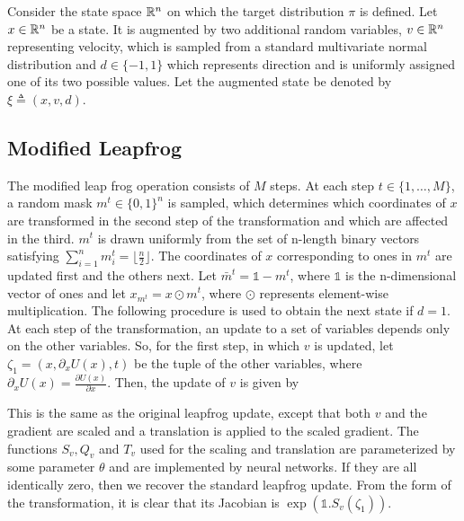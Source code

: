 \documentclass[letterpaper,english,10pt]{article}
\begin{document}
Consider the state space $\mathbb{R}^n$ on which the target distribution $\pi$ is defined. Let $x \in \mathbb{R}^n$ be a state. It is augmented by two additional random variables, $v \in \mathbb{R}^n$ representing velocity, which is sampled from a standard multivariate normal distribution and $d \in \{-1, 1\}$ which represents direction and is uniformly assigned one of its two possible values. Let the augmented state be denoted by $\xi \triangleq (x,v,d)$.

\subsection{Modified Leapfrog}
The modified leap frog operation consists of $M$ steps. At each step $t \in \{1, \dots, M \}$, a random mask $m^t \in \{ 0, 1 \}^n$ is sampled, which determines which coordinates of $x$ are transformed in the second step of the transformation and which are affected in the third. $m^t$ is drawn uniformly from the set of n-length binary vectors satisfying $ \sum_{i=1}^{n} m_i^t = \lfloor \frac{n}{2} \rfloor $. The coordinates of $x$ corresponding to ones in $m^t$ are updated first and the others next. Let $\bar{m}^t = \mathbb{1} - m^t$, where $\mathbb{1}$ is the n-dimensional vector of ones and let $x_{m^t} = x \odot m^t$, where $\odot$ represents element-wise multiplication. The following procedure is used to obtain the next state if $d=1$.\\

At each step of the transformation, an update to a set of variables depends only on the other variables. So, for the first step, in which $v$ is updated, let $\zeta_1 = (x, \partial_x U(x), t)$ be the tuple of the other variables, where $\partial_x U(x) = \frac{\partial U(x)}{\partial x}$. Then, the update of $v$ is given by


This is the same as the original leapfrog update, except that both $v$ and the gradient are scaled and a translation is applied to the scaled gradient. The functions $S_v, Q_v$ and $T_v$ used for the scaling and translation are parameterized by some parameter $\theta$ and are implemented by neural networks. If they are all identically zero, then we recover the standard leapfrog update. From the form of the transformation, it is clear that its Jacobian is $\exp(\mathbb{1}.S_v(\zeta_1))$. \\
\end{document}
